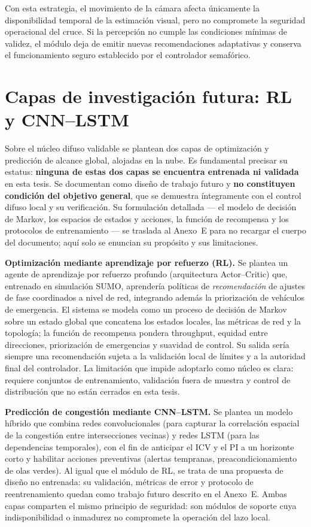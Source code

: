 Con esta estrategia, el movimiento de la cámara afecta únicamente la disponibilidad temporal de la
estimación visual, pero no compromete la seguridad operacional del cruce. Si la percepción no cumple las
condiciones mínimas de validez, el módulo deja de emitir nuevas recomendaciones adaptativas y conserva el
funcionamiento seguro establecido por el controlador semafórico.

\section{Capas de investigación futura: RL y CNN--LSTM}\label{sec:capas-futuras}

Sobre el núcleo difuso validable se plantean dos capas de optimización y predicción de alcance
global, alojadas en la nube. Es fundamental precisar su estatus: \textbf{ninguna de estas dos
capas se encuentra entrenada ni validada} en esta tesis. Se documentan como diseño de trabajo
futuro y \textbf{no constituyen condición del objetivo general}, que se demuestra íntegramente
con el control difuso local y su verificación. Su formulación detallada --- el modelo de
decisión de Markov, los espacios de estados y acciones, la función de recompensa y los
protocolos de entrenamiento --- se traslada al Anexo~E para no recargar el cuerpo del documento;
aquí solo se enuncian su propósito y sus limitaciones.

\textbf{Optimización mediante aprendizaje por refuerzo (RL).} Se plantea un agente de
aprendizaje por refuerzo profundo (arquitectura Actor--Critic) que, entrenado en simulación
SUMO, aprendería políticas de \emph{recomendación} de ajustes de fase coordinados a nivel de
red, integrando además la priorización de vehículos de emergencia. El sistema se modela como un
proceso de decisión de Markov sobre un estado global que concatena los estados locales, las
métricas de red y la topología; la función de recompensa pondera throughput, equidad entre
direcciones, priorización de emergencias y suavidad de control. Su salida sería siempre una
recomendación sujeta a la validación local de límites y a la autoridad final del controlador.
La limitación que impide adoptarlo como núcleo es clara: requiere conjuntos de entrenamiento,
validación fuera de muestra y control de distribución que no están cerrados en esta tesis.

\textbf{Predicción de congestión mediante CNN--LSTM.} Se plantea un modelo híbrido que combina
redes convolucionales (para capturar la correlación espacial de la congestión entre
intersecciones vecinas) y redes LSTM (para las dependencias temporales), con el fin de anticipar
el ICV y el PI a un horizonte corto y habilitar acciones preventivas (alertas tempranas,
preacondicionamiento de olas verdes). Al igual que el módulo de RL, se trata de una propuesta de
diseño no entrenada: su validación, métricas de error y protocolo de reentrenamiento quedan como
trabajo futuro descrito en el Anexo~E. Ambas capas comparten el mismo principio de seguridad: son
módulos de soporte cuya indisponibilidad o inmadurez no compromete la operación del lazo local.

